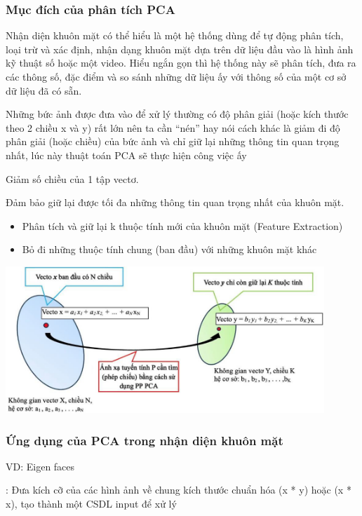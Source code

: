 \documentclass[12pt,a4paper]{article}
\begin{document}
\subsubsection{Mục đích của phân tích PCA}

Nhận diện khuôn mặt có thể hiểu là một hệ thống dùng để tự động phân tích, loại trừ và xác định, nhận dạng khuôn mặt dựa trên dữ liệu đầu vào là hình ảnh kỹ thuật số hoặc một video. Hiểu ngắn gọn thì hệ thống này sẽ phân tích, đưa ra các thông số, đặc điểm và so sánh những dữ liệu ấy với thông số của một cơ sở dữ liệu đã có sẵn.

Những bức ảnh được đưa vào để xử lý thường có độ phân giải (hoặc kích thước theo 2 chiều x và y) rất lớn nên ta cần “nén” hay nói cách khác là giảm đi độ phân giải (hoặc chiều) của bức ảnh và chỉ giữ lại những thông tin quan trọng nhất, lúc này thuật toán PCA sẽ thực hiện công việc ấy


Giảm số chiều của 1 tập vectơ.

Đảm bảo giữ lại được tối đa những thông tin quan trọng nhất của khuôn mặt.
\begin{itemize}
    \item Phân tích và giữ lại k thuộc tính mới của khuôn mặt (Feature Extraction)
    \item Bỏ đi những thuộc tính chung (ban đầu) với những khuôn mặt khác
\end{itemize}
\begin{center}
    \includegraphics[width = 0.9\textwidth]{6.png}
\end{center}
\subsubsection{Ứng dụng của PCA trong nhận diện khuôn mặt}
VD: Eigen faces

: Đưa kích cỡ của các hình ảnh về chung kích thước chuẩn hóa (x * y) hoặc (x * x), tạo thành một CSDL input để xử lý
\end{document}
